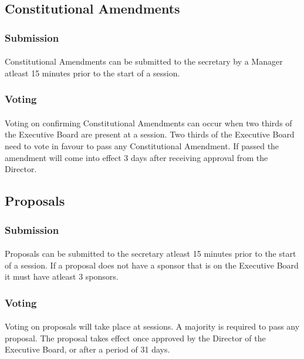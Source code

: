 \documentclass[10pt,a4paper]{article}
\begin{document}
\subsection{Constitutional Amendments}
\subsubsection{Submission}
\paragraph{}
Constitutional Amendments can be submitted to the secretary by a Manager atleast 15 minutes prior to the start of a session.
\subsubsection{Voting}
\paragraph{}
Voting on confirming Constitutional Amendments can occur when two thirds of the Executive Board are present at a session. Two thirds of the Executive Board need to vote in favour to pass any Constitutional Amendment. If passed the amendment will come into effect 3 days after receiving approval from the Director.
\subsection{Proposals}
\subsubsection{Submission}
\paragraph{}
Proposals can be submitted to the secretary atleast 15 minutes prior to the start of a session. If a proposal does not have a sponsor that is on the Executive Board it must have atleast 3 sponsors.
\subsubsection{Voting}
\paragraph{}
Voting on proposals will take place at sessions. A majority is required to pass any proposal. The proposal takes effect once approved by the Director of the Executive Board, or after a period of 31 days.
\end{document}
